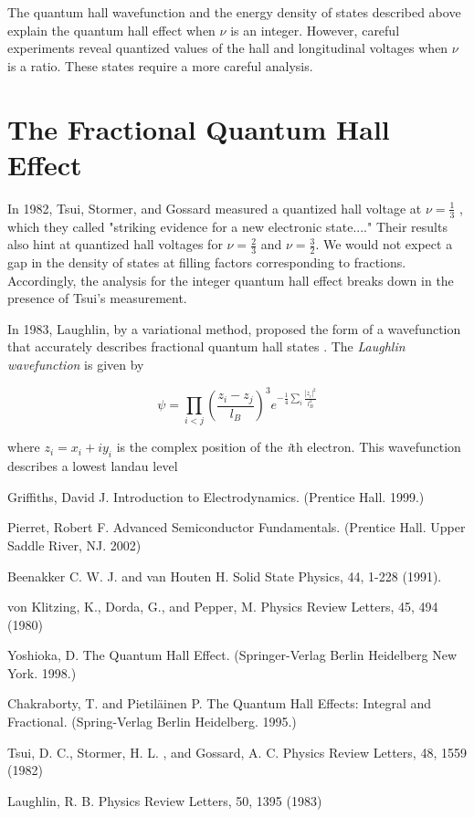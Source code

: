 \documentclass[12pt]{article}
\theoremstyle{definition}
\theoremstyle{remark}
\begin{document}
The quantum hall wavefunction and the energy density of states described above explain the quantum hall effect when $\nu$ is an integer. However, careful experiments reveal quantized values of the hall and longitudinal voltages when $\nu$ is a ratio. These states require a more careful analysis.

\section{The Fractional Quantum Hall Effect}

In 1982, Tsui, Stormer, and Gossard measured a quantized hall voltage at $\nu = \frac{1}{3}$ \cite{tsui:onethird}, which they called "striking evidence for a new electronic state...." Their results also hint at quantized hall voltages for $\nu = \frac{2}{3}$ and $\nu = \frac{3}{2}$. We would not expect a gap in the density of states at filling factors corresponding to fractions. Accordingly, the analysis for the integer quantum hall effect breaks down in the presence of Tsui's measurement.

In 1983, Laughlin, by a variational method, proposed the form of a wavefunction that accurately describes fractional quantum hall states \cite{lau:fqhe}. The \textit{Laughlin wavefunction} is given by

\begin{equation}
\psi = \prod_{i < j} \left( \frac{z_{i} - z_{j}}{l_{B}} \right)^{3} e^{-\frac{1}{4} \sum_{i} \frac{|z_{i}|^{2}}{l_{B}^{2}}}
\end{equation}

where $z_{i} = x_{i} + iy_{i}$ is the complex position of the \textit{i}th electron. This wavefunction describes a lowest landau level 







\begin{thebibliography}{10}
Griffiths, David J. Introduction to Electrodynamics. (Prentice Hall. 1999.)

Pierret, Robert F. Advanced Semiconductor Fundamentals. (Prentice Hall. Upper Saddle River, NJ. 2002)

Beenakker C. W. J. and van Houten H. Solid State Physics, 44, 1-228 (1991).

von Klitzing, K., Dorda, G., and Pepper, M. Physics Review Letters, 45, 494 (1980)

Yoshioka, D. The Quantum Hall Effect. (Springer-Verlag Berlin Heidelberg New York. 1998.)

Chakraborty, T. and Pietil{\"a}inen P. The Quantum Hall Effects: Integral and Fractional. (Spring-Verlag Berlin Heidelberg. 1995.)

Tsui, D. C., Stormer, H. L. , and Gossard, A. C. Physics Review Letters, 48, 1559 (1982)

Laughlin, R. B. Physics Review Letters, 50, 1395 (1983)

\end{thebibliography}
\end{document}
